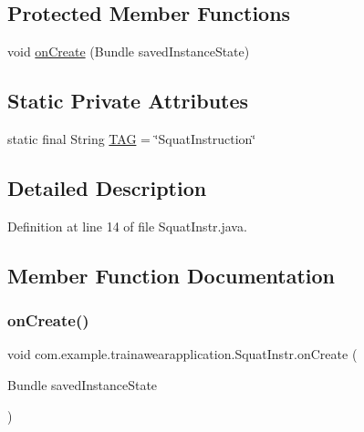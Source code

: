 \subsection*{Protected Member Functions}
\begin{DoxyCompactItemize}
\item 
void \mbox{\hyperlink{classcom_1_1example_1_1trainawearapplication_1_1_squat_instr_a7e7f753fc9bfbdc0dc8b8db20a59713e}{on\+Create}} (Bundle saved\+Instance\+State)
\end{DoxyCompactItemize}
\subsection*{Static Private Attributes}
\begin{DoxyCompactItemize}
\item 
static final String \mbox{\hyperlink{classcom_1_1example_1_1trainawearapplication_1_1_squat_instr_ad7fe74204afe9fb8319e762c400a9d9d}{T\+AG}} = \char`\"{}Squat\+Instruction\char`\"{}
\end{DoxyCompactItemize}


\subsection{Detailed Description}


Definition at line 14 of file Squat\+Instr.\+java.



\subsection{Member Function Documentation}
\mbox{\label{classcom_1_1example_1_1trainawearapplication_1_1_squat_instr_a7e7f753fc9bfbdc0dc8b8db20a59713e}} 
\subsubsection{\texorpdfstring{onCreate()}{onCreate()}}
{\footnotesize\ttfamily void com.\+example.\+trainawearapplication.\+Squat\+Instr.\+on\+Create (\begin{DoxyParamCaption}\item[{Bundle}]{saved\+Instance\+State }\end{DoxyParamCaption})\hspace{0.3cm}{\ttfamily [protected]}}



